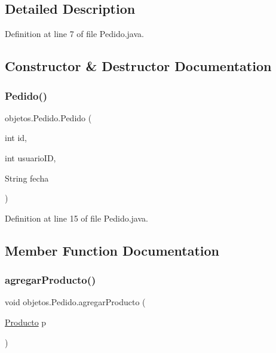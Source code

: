 \subsection{Detailed Description}


Definition at line 7 of file Pedido.\+java.



\subsection{Constructor \& Destructor Documentation}
\mbox{\label{classobjetos_1_1_pedido_a2f4d8a34c054b61efca09e21891dc119}} 
\subsubsection{\texorpdfstring{Pedido()}{Pedido()}}
{\footnotesize\ttfamily objetos.\+Pedido.\+Pedido (\begin{DoxyParamCaption}\item[{int}]{id,  }\item[{int}]{usuario\+ID,  }\item[{String}]{fecha }\end{DoxyParamCaption})}



Definition at line 15 of file Pedido.\+java.



\subsection{Member Function Documentation}
\mbox{\label{classobjetos_1_1_pedido_ac1b1b41df8f346ef077017deccf269b5}} 
\subsubsection{\texorpdfstring{agregar\+Producto()}{agregarProducto()}}
{\footnotesize\ttfamily void objetos.\+Pedido.\+agregar\+Producto (\begin{DoxyParamCaption}\item[{\mbox{\hyperlink{classobjetos_1_1_producto}{Producto}}}]{p }\end{DoxyParamCaption})}



